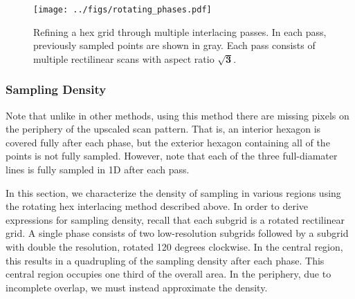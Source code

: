 \documentclass[aip, amsmath, amssymb, nobibnotes, nofootinbib, citeautoscript, reprint, superscriptaddress]{revtex4-1}
\begin{document}
    \begin{figure*}
        \centering
        \texttt{[image: ../figs/rotating\_phases.pdf]}
        \caption{
        \label{fig:rotatingphases} Refining a hex grid through multiple interlacing passes.
        In each pass, previously sampled points are shown in gray.
        Each pass consists of multiple rectilinear scans with aspect ratio $\mathbf{\sqrt{3}}$.
        }
    \end{figure*}




    \subsubsection{\label{sec:density}Sampling Density}

    Note that unlike in other methods, using this method there are missing pixels on the periphery of the upscaled scan pattern.
    That is, an interior hexagon is covered fully after each phase, but the exterior hexagon containing all of the points is not fully sampled.
    However, note that each of the three full-diamater lines is fully sampled in 1D after each pass.


    In this section, we characterize the density of sampling in various regions using the rotating hex interlacing method described above.
    In order to derive expressions for sampling density, recall that each subgrid is a rotated rectilinear grid.
    A single phase consists of two low-resolution subgrids followed by a subgrid with double the resolution, rotated 120 degrees clockwise.
    In the central region, this results in a quadrupling of the sampling density after each phase.
    This central region occupies one third of the overall area.
    In the periphery, due to incomplete overlap, we must instead approximate the density.
\end{document}
